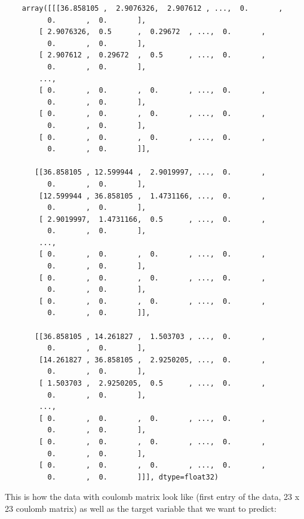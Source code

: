 \documentclass[a4paper,oneside,openright,11pt]{book}
\begin{document}
\begin{verbatim}
    array([[[36.858105 ,  2.9076326,  2.907612 , ...,  0.       ,
          0.       ,  0.       ],
        [ 2.9076326,  0.5      ,  0.29672  , ...,  0.       ,
          0.       ,  0.       ],
        [ 2.907612 ,  0.29672  ,  0.5      , ...,  0.       ,
          0.       ,  0.       ],
        ...,
        [ 0.       ,  0.       ,  0.       , ...,  0.       ,
          0.       ,  0.       ],
        [ 0.       ,  0.       ,  0.       , ...,  0.       ,
          0.       ,  0.       ],
        [ 0.       ,  0.       ,  0.       , ...,  0.       ,
          0.       ,  0.       ]],

       [[36.858105 , 12.599944 ,  2.9019997, ...,  0.       ,
          0.       ,  0.       ],
        [12.599944 , 36.858105 ,  1.4731166, ...,  0.       ,
          0.       ,  0.       ],
        [ 2.9019997,  1.4731166,  0.5      , ...,  0.       ,
          0.       ,  0.       ],
        ...,
        [ 0.       ,  0.       ,  0.       , ...,  0.       ,
          0.       ,  0.       ],
        [ 0.       ,  0.       ,  0.       , ...,  0.       ,
          0.       ,  0.       ],
        [ 0.       ,  0.       ,  0.       , ...,  0.       ,
          0.       ,  0.       ]],

       [[36.858105 , 14.261827 ,  1.503703 , ...,  0.       ,
          0.       ,  0.       ],
        [14.261827 , 36.858105 ,  2.9250205, ...,  0.       ,
          0.       ,  0.       ],
        [ 1.503703 ,  2.9250205,  0.5      , ...,  0.       ,
          0.       ,  0.       ],
        ...,
        [ 0.       ,  0.       ,  0.       , ...,  0.       ,
          0.       ,  0.       ],
        [ 0.       ,  0.       ,  0.       , ...,  0.       ,
          0.       ,  0.       ],
        [ 0.       ,  0.       ,  0.       , ...,  0.       ,
          0.       ,  0.       ]]], dtype=float32)
\end{verbatim}


This is how the data with coulomb matrix look like (first entry of the data, 23 x 23 coulomb matrix) as well as the target variable that we want to predict:
\end{document}
